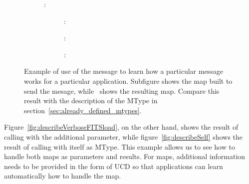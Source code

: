 \begin{figure}[tbp]
{\begin{minipage}{0.67\columnwidth}
\begin{small}
\begin{description}
\begin{description}
\begin{description}
								\item[]:
								\begin{description}
									\item[]:
									\item[]:
									\item[]:
								\end{description}
							\end{description} 
						\end{description}
					\end{description}
					\end{small}
				\end{minipage}
			} 
			\caption[Using \texttt{movoir.describe.mtype}
			on the  method.]
			{
				Example of use of the
				 message to learn how
				a particular message works for a particular
				application. Subfigure
				 shows
				the map built to send the
				 mesage,
				while~
				shows the resulting map. Compare this result with
				the description of the 
				MType in section~\ref{sec:already_defined_mtypes}.
			}
			\label{fig:describeMtypeVOTableLoad}
		\end{figure}
		
		Figure~\ref{fig:describeVerboseFITSload}, on the other
		hand, shows the result of calling
		 with the additional
		 parameter, while
		figure~\ref{fig:describeSelf} shows the result of calling
		 with itself as MType. This
		example allows us to see how to handle both maps as 
		parameters and results. For maps, additional information 
		needs to be provided in the form of UCD so that applications
		can learn automatically how to handle the map.
		
